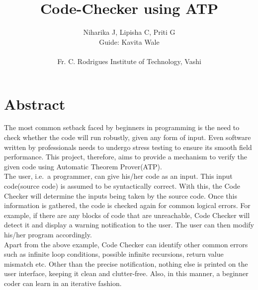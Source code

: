 \documentclass[]{article}
\begin{document}
	\title{\huge\textbf{Code-Checker using ATP}}
	\author{Niharika J, Lipisha C, Priti G  \\Guide: Kavita Wale \\ \\ \LARGE Fr. C. Rodrigues Institute of Technology, Vashi}
	\maketitle
	\pagebreak

\section{Abstract}\label{abstract}

The most common setback faced by beginners in programming is the need to
check whether the code will run robustly, given any form of input. Even
software written by professionals needs to undergo stress testing to
ensure its smooth field performance. This project, therefore, aims to
provide a mechanism to verify the given code using Automatic Theorem
Prover(ATP). \\

The user, i.e.~a programmer, can give his/her code as an input. This
input code(source code) is assumed to be syntactically correct. With
this, the Code Checker will determine the inputs being taken by the
source code. Once this information is gathered, the code is checked
again for common logical errors. For example, if there are any blocks of
code that are unreachable, Code Checker will detect it and display a
warning notification to the user. The user can then modify his/her
program accordingly. \\

Apart from the above example, Code Checker can identify other common
errors such as infinite loop conditions, possible infinite recursions,
return value mismatch etc. Other than the precise notification, nothing
else is printed on the user interface, keeping it clean and
clutter-free. Also, in this manner, a beginner coder can learn in an
iterative fashion.
\end{document}

